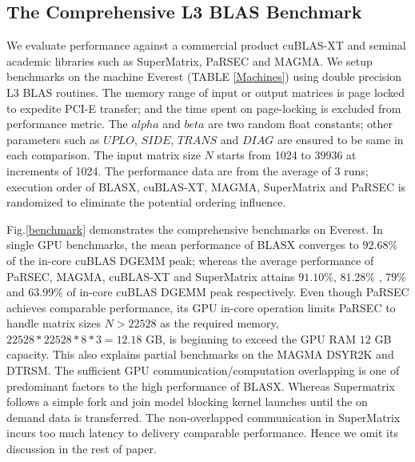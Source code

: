 \documentclass[conference]{IEEEtran}
\begin{document}
\vspace{-0.12in}
\subsection{The Comprehensive L3 BLAS Benchmark}
\vspace{-0.05in}

We evaluate performance against a commercial product cuBLAS-XT and seminal 
academic libraries such as SuperMatrix, PaRSEC and MAGMA.
We setup benchmarks on the machine Everest (TABLE \ref{Machines}) using double precision L3 BLAS 
routines. The memory range of input or output matrices is page locked to expedite PCI-E transfer; 
and the time spent on page-locking is excluded from performance metric. The $alpha$ and $beta$ 
are two random float constants; other parameters such as $UPLO$, $SIDE$, $TRANS$ and $DIAG$ 
are ensured to be same in each comparison. The input matrix size $N$ starts from 1024 to 39936 at 
increments of 1024. The performance data are from the average of 3 runs; execution order of 
BLASX, cuBLAS-XT, MAGMA, SuperMatrix and PaRSEC is randomized to eliminate the potential ordering 
influence.

Fig.\ref{benchmark} demonstrates the comprehensive benchmarks on Everest. 
In single GPU benchmarks, the mean performance of BLASX converges to $92.68\%$ of 
the in-core cuBLAS DGEMM peak; whereas the average performance of PaRSEC, MAGMA, cuBLAS-XT 
and SuperMatrix attains $91.10\%$, $81.28\%$ , $79\%$ and $63.99\%$ of in-core cuBLAS DGEMM 
peak respectively. Even though PaRSEC achieves comparable performance, its GPU in-core 
operation limits PaRSEC to handle matrix sizes $N > 22528$ as the required memory, 
$22528*22528*8*3 = 12.18$ GB, is beginning to exceed the GPU RAM $12$ GB capacity. This also 
explains partial benchmarks on the MAGMA DSYR2K and DTRSM. The sufficient GPU 
communication/computation overlapping is one of predominant factors to the high performance 
of BLASX. Whereas Supermatrix follows a simple fork and join model blocking kernel launches 
until the on demand data is transferred. The non-overlapped communication in SuperMatrix 
incurs too much latency to delivery comparable performance. Hence we omit its discussion 
in the rest of paper.
\end{document}
